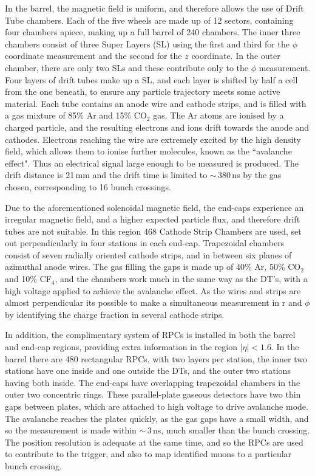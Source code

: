 In the barrel, the magnetic field is uniform, and therefore allows the use of Drift Tube chambers.  Each of the five wheels are made up of 12 sectors, containing four chambers apiece, making up a full barrel of 240 chambers. The inner three chambers consist of three Super Layers (SL) using the first and third for the $\phi$ coordinate measurement and the second for the $z$ coordinate. In the outer chamber,  there are only two SLs and these contribute only to the $\phi$ measurement. Four layers of drift tubes make up a SL, and each layer is shifted by half a cell from the one beneath, to ensure any particle trajectory meets some active material. Each tube contains an anode wire and cathode strips, and is filled with a gas mixture of 85\% Ar and 15\% CO$_{2}$ gas. The Ar atoms are ionised by a charged particle, and the resulting electrons and ions drift towards the anode and cathodes. Electrons reaching the wire are extremely excited by the high density field, which allows them to ionise further molecules, known as the ``avalanche effect". Thus an electrical signal large enough to be measured is produced. The drift distance is 21\,mm and the drift time is limited to $\sim$\,380\,ns by the gas chosen, corresponding to 16 bunch crossings.

Due to the aforementioned solenoidal magnetic field, the end-caps experience an irregular magnetic field, and a higher expected particle flux, and therefore drift tubes are not suitable. In this region 468 Cathode Strip Chambers are used, set out perpendicularly in four stations in each end-cap. Trapezoidal chambers consist of seven radially oriented cathode strips, and in between six planes of azimuthal anode wires. The gas filling the gaps is made up of 40\% Ar, 50\% CO$_{2}$ and 10\% CF$_{4}$, and the chambers work much in the same way as the DT's, with a high voltage applied to achieve the avalanche effect. As the wires and strips are almost perpendicular its possible to make a simultaneous measurement in r and $\phi$ by identifying the charge fraction in several cathode strips. 

In addition, the complimentary system of RPCs is installed in both the barrel and end-cap regions, providing extra information in the region $|\eta| < 1.6$. In the barrel there are 480 rectangular RPCs, with two layers per station, the inner two stations have one inside and one outside the DTs, and the outer two stations having both inside. The end-caps have overlapping trapezoidal chambers in the outer two concentric rings. These parallel-plate gaseous detectors have two thin gaps between plates, which are attached to high voltage to drive avalanche mode. The avalanche reaches the plates quickly, as the gas gaps have a small width, and so the measurement is made within $\sim$\,3\,ns, much smaller than the bunch crossing. The position resolution is adequate at the same time, and so the RPCs are used to contribute to the trigger, and also to map identified muons to a particular bunch crossing.

